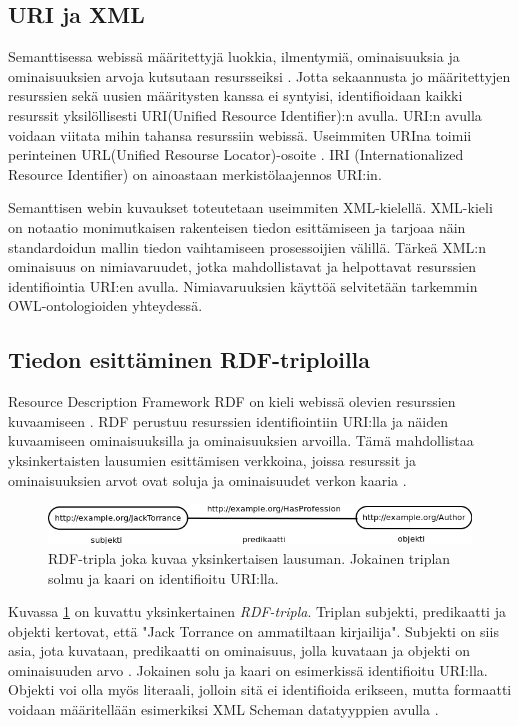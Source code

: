 \documentclass[finnish]{tktltiki2}
\theoremstyle{definition}
\theoremstyle{remark}
\begin{document}
\subsection{URI ja XML}

Semanttisessa webissä määritettyjä luokkia, ilmentymiä, ominaisuuksia ja ominaisuuksien
arvoja kutsutaan resursseiksi \cite{BHL01}. Jotta sekaannusta jo määritettyjen resurssien
sekä uusien määritysten kanssa ei syntyisi, identifioidaan kaikki resurssit
yksilöllisesti URI(Unified Resource Identifier):n avulla.
URI:n avulla voidaan viitata mihin tahansa resurssiin webissä. Useimmiten
URIna toimii perinteinen URL(Unified Resourse Locator)-osoite \cite{BHL01}. IRI
(Internationalized Resource Identifier) on ainoastaan merkistölaajennos URI:in.
 
 Semanttisen webin kuvaukset toteutetaan useimmiten XML-kielellä.
XML-kieli on notaatio monimutkaisen rakenteisen tiedon esittämiseen ja
tarjoaa näin standardoidun mallin tiedon vaihtamiseen prosessoijien välillä.
Tärkeä XML:n ominaisuus on nimiavaruudet, jotka mahdollistavat ja helpottavat resurssien
identifiointia URI:en avulla. Nimiavaruuksien käyttöä selvitetään tarkemmin
OWL-ontologioiden yhteydessä. 

\subsection{Tiedon esittäminen RDF-triploilla}

Resource Description Framework RDF on kieli webissä olevien resurssien
kuvaamiseen \cite{RDFP}. 
RDF perustuu resurssien identifiointiin URI:lla ja näiden kuvaamiseen 
ominaisuuksilla ja ominaisuuksien arvoilla. Tämä mahdollistaa yksinkertaisten
lausumien esittämisen verkkoina, joissa resurssit ja ominaisuuksien arvot ovat soluja ja
ominaisuudet verkon 
kaaria \cite{RDFP}. %

\begin{figure}[h]
 \centering
 \includegraphics[scale=0.50]{JackTorrance.png}
 \caption{RDF-tripla joka kuvaa yksinkertaisen lausuman. Jokainen triplan solmu
ja kaari on identifioitu URI:lla. }
 \label{jack}
\end{figure}

Kuvassa \ref{jack} on kuvattu yksinkertainen \textit{RDF-tripla}.
Triplan subjekti, predikaatti ja objekti kertovat, että "Jack Torrance on ammatiltaan
kirjailija". Subjekti on siis asia, jota kuvataan, predikaatti on ominaisuus, jolla 
kuvataan ja objekti on ominaisuuden arvo \cite{RDFP}. 
Jokainen solu ja kaari on esimerkissä identifioitu URI:lla. Objekti voi olla
myös literaali, jolloin 
sitä ei identifioida erikseen, mutta formaatti voidaan määritellään esimerkiksi XML Scheman
datatyyppien avulla \cite{RDFP}. 
\end{document}
